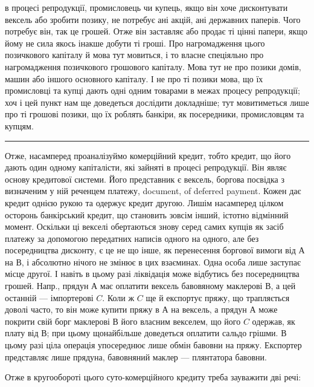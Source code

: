 \parcont{}  %
в процесі репродукції, промисловець чи купець, якщо він хоче дисконтувати
вексель або зробити позику, не потребує ані акцій, ані державних паперів. Чого
потребує він, так це грошей. Отже він заставляє або продає ті цінні папери, якщо
йому не сила якось інакше добути ті гроші. Про нагромадження цього позичкового
капіталу й мова тут мовиться, і то власне спеціяльно про нагромадження позичкового
грошового капіталу. Мова тут не про позики домів, машин або іншого
основного капіталу. І не про ті позики мова, що їх промисловці та купці дають
одні одним товарами в межах процесу репродукції; хоч і цей пункт нам ще
доведеться дослідити докладніше; тут мовитиметься лише про ті грошові позики,
що їх роблять банкіри, як посередники, промисловцям та купцям.

\pfbreak

Отже, насамперед проаналізуймо комерційний кредит, тобто кредит, що його
дають один одному капіталісти, які зайняті в процесі репродукції. Він являє
основу кредитової системи. Його представник є вексель, боргова посвідка з визначеним
у ній реченцем платежу, document, of deferred payment. Кожен дає кредит
однією рукою та одержує кредит другою. Лишім насамперед цілком осторонь банкірський
кредит, що становить зовсім інший, істотно відмінний момент. Оскільки ці
векселі обертаються знову серед самих купців як засіб платежу за допомогою
передатних написів одного на одного, але без посередництва дисконту, є це не
що інше, як перенесення боргової вимоги від $А$ на $В$, і абсолютно нічого не
змінює в цих взаєминах. Одна особа лише заступає місце другої. І навіть
в цьому разі ліквідація може відбутись без посередництва грошей. Напр., прядун
$А$ має оплатити вексель бавовяному маклерові $В$, а цей останній — імпортерові $C$.
Коли ж $C$ ще й експортує пряжу, що трапляється доволі часто, то він може
купити пряжу в $А$ на вексель, а прядун $А$ може покрити свій борг маклерові $В$
його власним векселем, що його $C$ одержав, як плату від $В$; при цьому щонайбільше
доведеться оплатити сальдо грішми. В цьому разі ціла операція
упосереднює лише обмін бавовни на пряжу. Експортер представляє лише прядуна,
бавовняний маклер — плянтатора бавовни.

Отже в кругообороті цього суто-комерційного кредиту треба зауважити дві речі:

